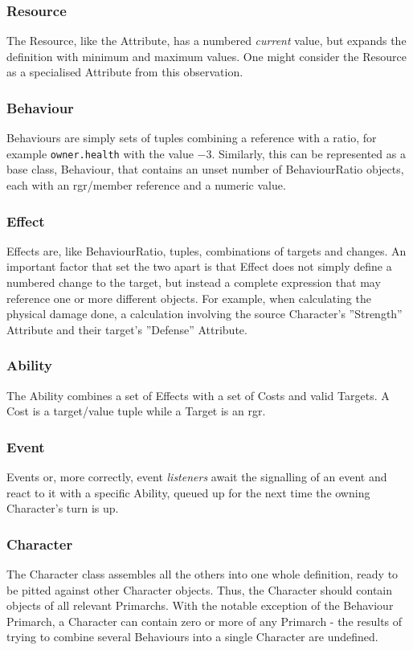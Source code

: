 \subsubsection*{Resource}
The Resource, like the Attribute, has a numbered \emph{current} value, but expands the definition with minimum and maximum values. One might consider the Resource as a specialised Attribute from this observation.

\subsubsection*{Behaviour}
Behaviours are simply sets of tuples combining a reference with a ratio, for example \texttt{owner.health} with the value $-3$. Similarly, this can be represented as a base class, Behaviour, that contains an unset number of BehaviourRatio objects, each with an \ac{rgr}/member reference and a numeric value.

\subsubsection*{Effect}
Effects are, like BehaviourRatio, tuples, combinations of targets and changes. An important factor that set the two apart is that Effect does not simply define a numbered change to the target, but instead a complete expression that may reference one or more different objects. For example, when calculating the physical damage done, a calculation involving the source Character's ''Strength'' Attribute and their target's ''Defense'' Attribute.

\subsubsection*{Ability}
The Ability combines a set of Effects with a set of Costs and valid Targets. A Cost is a target/value tuple while a Target is an \ac{rgr}.

\subsubsection*{Event}
Events or, more correctly, event \emph{listeners} await the signalling of an event and react to it with a specific Ability, queued up for the next time the owning Character's turn is up.

\subsubsection*{Character}
The Character class assembles all the others into one whole definition, ready to be pitted against other Character objects. Thus, the Character should contain objects of all relevant Primarchs. With the notable exception of the Behaviour Primarch, a Character can contain zero or more of any Primarch - the results of trying to combine several Behaviours into a single Character are undefined.

